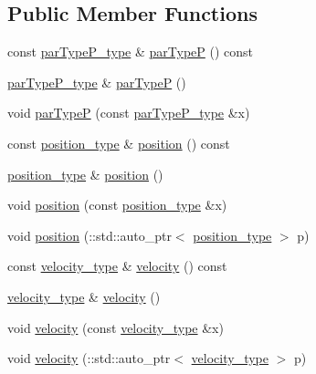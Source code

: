 \subsection*{Public Member Functions}
\begin{DoxyCompactItemize}
\item 
const \hyperlink{classparticle__t_ab30c5ebbd1c4aabb95799f34942b72b2}{par\-Type\-P\-\_\-type} \& \hyperlink{classparticle__t_ac2db0331abd5d49f5eb8b51502dcd05b}{par\-Type\-P} () const 
\item 
\hyperlink{classparticle__t_ab30c5ebbd1c4aabb95799f34942b72b2}{par\-Type\-P\-\_\-type} \& \hyperlink{classparticle__t_ac0dacfd86d82a7905dbd4ebd545d6100}{par\-Type\-P} ()
\item 
void \hyperlink{classparticle__t_afa7c5084c5d3b91017696b601f2d3c13}{par\-Type\-P} (const \hyperlink{classparticle__t_ab30c5ebbd1c4aabb95799f34942b72b2}{par\-Type\-P\-\_\-type} \&x)
\item 
const \hyperlink{classparticle__t_af0130f9c47a13c68332f04389a6f0d2c}{position\-\_\-type} \& \hyperlink{classparticle__t_a3a81b45d11c1756509ca7cf54ca2a3eb}{position} () const 
\item 
\hyperlink{classparticle__t_af0130f9c47a13c68332f04389a6f0d2c}{position\-\_\-type} \& \hyperlink{classparticle__t_ae9b1bbf223bc9fb9f3c48ad71a3b41cf}{position} ()
\item 
void \hyperlink{classparticle__t_acf73b178e4f95313f49c770c55155f9d}{position} (const \hyperlink{classparticle__t_af0130f9c47a13c68332f04389a6f0d2c}{position\-\_\-type} \&x)
\item 
void \hyperlink{classparticle__t_a6749155496ca35433c0fea5d90a4ebf5}{position} (\-::std\-::auto\-\_\-ptr$<$ \hyperlink{classparticle__t_af0130f9c47a13c68332f04389a6f0d2c}{position\-\_\-type} $>$ p)
\item 
const \hyperlink{classparticle__t_a19095006cf2a2dd955fc026420b38512}{velocity\-\_\-type} \& \hyperlink{classparticle__t_a2ebfb7ecdab965984711284cae8d53e9}{velocity} () const 
\item 
\hyperlink{classparticle__t_a19095006cf2a2dd955fc026420b38512}{velocity\-\_\-type} \& \hyperlink{classparticle__t_acf98941eb87e25f1236f86868b9152df}{velocity} ()
\item 
void \hyperlink{classparticle__t_aafc63693d909a979c9eaf360241be925}{velocity} (const \hyperlink{classparticle__t_a19095006cf2a2dd955fc026420b38512}{velocity\-\_\-type} \&x)
\item 
void \hyperlink{classparticle__t_a4ed3bfb4eb196658032b4a3d4ff1bcb1}{velocity} (\-::std\-::auto\-\_\-ptr$<$ \hyperlink{classparticle__t_a19095006cf2a2dd955fc026420b38512}{velocity\-\_\-type} $>$ p)

\end{DoxyCompactItemize}

